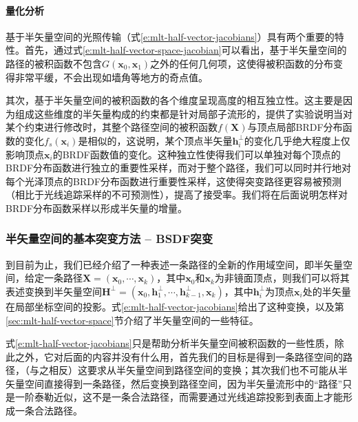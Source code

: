 \paragraph{量化分析}
基于半矢量空间的光照传输（式\ref{e:mlt-half-vector-jacobians}）具有两个重要的特性。首先，通过式\ref{e:mlt-half-vector-space-jacobian}可以看出，基于半矢量空间的路径的被积函数不包含$G(\mathbf{x}_0,\mathbf{x}_1)$之外的任何几何项，这使得被积函数的分布变得非常平缓，不会出现如墙角等地方的奇点值。

其次，基于半矢量空间的被积函数的各个维度呈现高度的相互独立性。这主要是因为组成这些维度的半矢量构成的约束都是针对局部子流形的，\cite{a:TheNaturalConstraintRepresentationofthePathSpaceforEfficientLightTransportSimulation}提供了实验说明当对某个约束进行修改时，其整个路径空间的被积函数$f(\mathbf{X})$与顶点局部BRDF分布函数的变化$f_s(\mathbf{x}_i)$是相似的，这说明，某个顶点半矢量$\mathbf{h}^{\perp}_i$的变化几乎绝大程度上仅影响顶点$\mathbf{x}_i$的BRDF函数值的变化。这种独立性使得我们可以单独对每个顶点的BRDF分布函数进行独立的重要性采样，而对于整个路径，我们可以同时并行地对每个光泽顶点的BRDF分布函数进行重要性采样，这使得突变路径更容易被预测（相比于光线追踪采样的不可预测性），提高了接受率。我们将在后面说明怎样对BRDF分布函数采样以形成半矢量的增量。





\subsubsection{半矢量空间的基本突变方法 -- BSDF突变}\label{sec:mlt-BSDF-perturbation}
到目前为止，我们已经介绍了一种表述一条路径的全新的作用域空间，即半矢量空间，给定一条路径$\mathbf{X}=(\mathbf{x}_0,\cdots,\mathbf{x}_k)$，其中$\mathbf{x}_0$和$\mathbf{x}_k$为非镜面顶点，则我们可以将其表述变换到半矢量空间$\mathbf{H}^{\perp}=(\mathbf{x}_0,\mathbf{h}^{\perp}_1,\cdots,\mathbf{h}^{\perp}_{k-1},\mathbf{x}_k)$，其中$\mathbf{h}^{\perp}_i$为顶点$\mathbf{x}_i$处的半矢量在局部坐标空间的投影。式\ref{e:mlt-half-vector-jacobians}给出了这种变换，以及第\ref{sec:mlt-half-vector-space}节介绍了半矢量空间的一些特征。

式\ref{e:mlt-half-vector-jacobians}只是帮助分析半矢量空间被积函数的一些性质，除此之外，它对后面的内容并没有什么用，首先我们的目标是得到一条路径空间的路径，（与之相反）这要求从半矢量空间到路径空间的变换；其次我们也不可能从半矢量空间直接得到一条路径，然后变换到路径空间，因为半矢量流形中的“路径”只是一阶泰勒近似，这不是一条合法路径，而需要通过光线追踪投影到表面上才能形成一条合法路径。

